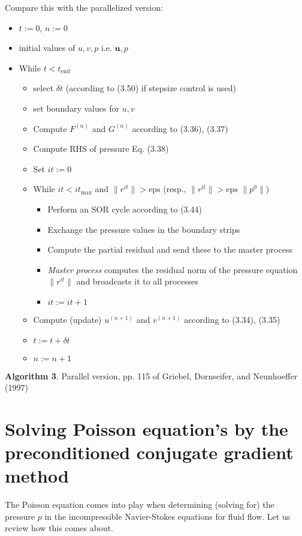 \documentclass[10pt]{amsart}
\begin{document}
\begin{multicols*}{2}
Compare this with the parallelized version:
\begin{itemize}
  \item $t:=0$, $n:= 0$ 
  \item initial values of $u,v, p$ i.e. $\mathbf{u},p$
  \item While $t<t_{\text{end}}$ \begin{itemize}
  \item select $\delta t$ (according to (3.50) if stepsize control is used)
  \item set boundary values for $u,v$
  \item Compute $F^{(n)}$ and $G^{(n)}$ according to (3.36), (3.37)
  \item Compute RHS of pressure Eq. (3.38)
  \item Set $it := 0$ 
  \item While $it < it_{\text{max}}$ and $\| r^{it} \| > \text{eps} $ (resp., $\|r^{it} \| > \text{eps } \| p^0 \|$) \begin{itemize}
    \item Perform an SOR cycle according to (3.44) 
    \item Exchange the pressure values in the boundary strips
    \item Compute the partial residual and send these to the master process
    \item \emph{Master process} computes the residual norm of the pressure equation $\|r^{it}\|$ and broadcasts it to all processes
      \item $it:= it +1$
  \end{itemize}
 \item   Compute (update) $u^{(n+1)}$ and $v^{(n+1)}$ according to (3.34), (3.35)
 \item $t:= t+ \delta t$ 
\item $n := n+1$
  \end{itemize}
\end{itemize}
\textbf{Algorithm 3}. Parallel version, pp. 115 of Griebel, Dornseifer, and Neunhoeffer (1997) \cite{GDN1997}

\section{Solving Poisson equation's by the preconditioned conjugate gradient method}

The Poisson equation comes into play when determining (solving for) the pressure $p$ in the incompressible Navier-Stokes equations for fluid flow.  Let us review how this comes about.  


\end{multicols*}
\end{document}
